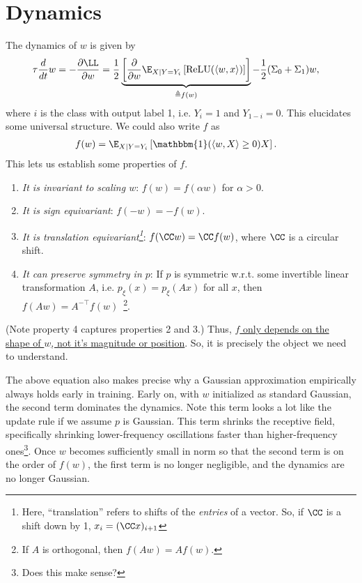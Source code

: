 \documentclass{article}
\begin{document}
\section{Dynamics}
The dynamics of $w$ is given by
\begin{align}
  \tau \frac{d}{dt} w
  &= - \frac{\partial \LL}{\partial w}
  = \frac{1}{2} \underbrace{ \left[ \frac{\partial}{\partial w} \E_{ X \mid Y = Y_i } \left[ \operatorname{ReLU}(\langle w, x \rangle) \right] \right] }_{\triangleq f(w)} - \frac{1}{2} ( \Sigma_0 + \Sigma_1 ) w,
\end{align}
where $i$ is the class with output label 1, i.e. $Y_i = 1$ and $Y_{1-i} = 0$.
This elucidates some universal structure.
We could also write $f$ as
\begin{align}
  f(w) &= \E_{ X \mid Y = Y_i } \left[ \mathbbm{1}(\langle w, X \rangle \geq 0) X \right]. \label{eq:f}
\end{align}
This lets us establish some properties of $f$.
\begin{enumerate}
  \item \emph{It is invariant to scaling $w$}: $f(w) = f(\alpha w)$ for $\alpha > 0$.
  \item \emph{It is sign equivariant}: $f(-w) = -f(w)$.
  \item \emph{It is translation equivariant\footnote{Here, ``translation'' refers to shifts of the \emph{entries} of a vector. So, if $\CC$ is a shift down by 1, $x_i = (\CC x)_{i+1}$}}: $f(\CC w) = \CC f(w)$, where $\CC$ is a circular shift.
  \item \emph{It can preserve symmetry in $p$}: If $p$ is symmetric w.r.t. some invertible linear  transformation $A$, i.e. $p_{\xi}(x) = p_{\xi}(A x)$ for all $x$, then $f(A w) = A^{-\top} f(w)$~\footnote{If $A$ is orthogonal, then $f(A w) = A f(w)$.}.
\end{enumerate}
(Note property 4 captures properties 2 and 3.)
Thus, \underline{$f$ only depends on the shape of $w$, not it's magnitude or position}.
So, it is precisely the object we need to understand.

The above equation also makes precise why a Gaussian approximation empirically always holds early in training.
Early on, with $w$ initialized as standard Gaussian, the second term dominates the dynamics.
Note this term looks a lot like the update rule if we assume $p$ is Gaussian.
This term shrinks the receptive field, specifically shrinking lower-frequency oscillations faster than higher-frequency ones\footnote{Does this make sense?}.
Once $w$ becomes sufficiently small in norm so that the second term is on the order of $f(w)$, the first term is no longer negligible, and the dynamics are no longer Gaussian.
\end{document}
